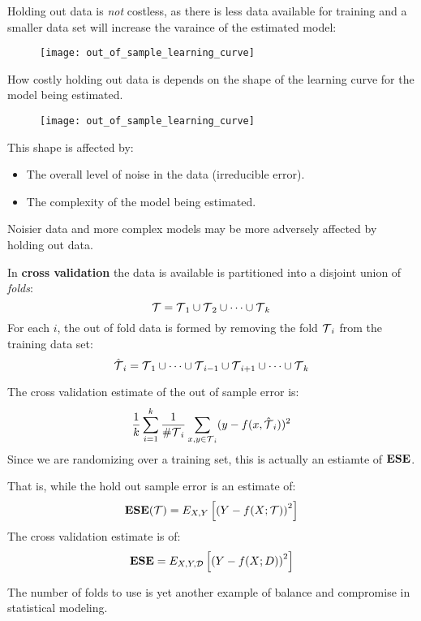 %
%
\begin{frame}
  Holding out data is \textit{not} costless, as there is less data available for
  training and a smaller data set will increase the varaince of the estimated
  model:
  \begin{figure}
    \texttt{[image: out\_of\_sample\_learning\_curve]}
  \end{figure}
  How costly holding out data is depends on the shape of the learning curve for
  the model being estimated.
\end{frame}
%
%
\begin{frame}
  \begin{figure}
    \texttt{[image: out\_of\_sample\_learning\_curve]}
  \end{figure}
  This shape is affected by:
  \begin{itemize}
    \item The overall level of noise in the data (irreducible error).
    \item The complexity of the model being estimated.
  \end{itemize}
  Noisier data and more complex models may be more adversely affected by holding
  out data.
\end{frame}
%
%
\begin{frame}
  In \textbf{cross validation} the data is available is partitioned into a
  disjoint union of \textit{folds}:
  $$ {\operatorname*{\mathcal{T}}} = {\operatorname*{\mathcal{T}}}_1 \cup {\operatorname*{\mathcal{T}}}_2 \cup \cdots \cup {\operatorname*{\mathcal{T}}}_k $$
  For each $i$, the out of fold data is formed by removing the fold ${\operatorname*{\mathcal{T}}}_i$ from
  the training data set:
  $$ \hat{{\operatorname*{\mathcal{T}}}}_i = {\operatorname*{\mathcal{T}}}_1 \cup \cdots \cup {\operatorname*{\mathcal{T}}}_{i-1} \cup {\operatorname*{\mathcal{T}}}_{i+1}
  \cup \cdots \cup {\operatorname*{\mathcal{T}}}_k $$
\end{frame}
%
%
\begin{frame}
  The cross validation estimate of the out of sample error is:
   $$ \frac{1}{k} \sum_{i=1}^{k} \frac{1}{\# {\operatorname*{\mathcal{T}}}_i } \sum_{x,y \in
   {\operatorname*{\mathcal{T}}}_i} (y - f(x, \hat{{\operatorname*{\mathcal{T}}}}_i))^2$$ 
   Since we are randomizing over a training set, this is actually an estiamte of
   $\operatorname*{\mathbf{ESE}}$.
\end{frame}
%
%
\begin{frame}
  That is, while the hold out sample error is an estimate of:
  $$\operatorname*{\mathbf{ESE}}(\operatorname*{\mathcal{T}}) = E_{X,Y} \left[ \left( Y - f(X; \operatorname*{\mathcal{T}}) \right)^2 \right]$$
  The cross validation estimate is of:
  $$\operatorname*{\mathbf{ESE}} = E_{X,Y,\operatorname*{\mathcal{D}}} \left[ \left( Y - f(X; D) \right)^2 \right]$$
\end{frame}
%
%
\begin{frame}
  The number of folds to use is yet another example of balance and compromise in
  statistical modeling.
\end{frame}
